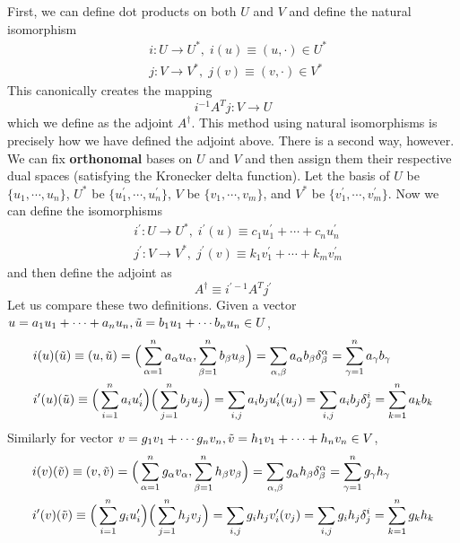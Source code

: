   First, we can define dot products on both $U$ and $V$ and define the natural isomorphism 
  \begin{align*}
    &i: U \longrightarrow U^\ast, \; i(u) \equiv (u, \cdot) \in U^\ast\\
    &j: V \longrightarrow V^\ast, \; j(v) \equiv (v, \cdot) \in V^\ast
  \end{align*}
  This canonically creates the mapping 
  \begin{equation}
    i^{-1} A^T j: V \longrightarrow U
  \end{equation}
  which we define as the adjoint $A^\dagger$. This method using natural isomorphisms is precisely how we have defined the adjoint above. There is a second way, however. We can fix \textbf{orthonomal} bases on $U$ and $V$ and then assign them their respective dual spaces (satisfying the Kronecker delta function). Let the basis of $U$ be $\{u_1, \cdots, u_n\}$, $U^\ast$ be $\{u_1^\prime, \cdots, u_n^\prime\}$, $V$ be $\{v_1, \cdots, v_m\}$, and $V^\ast$ be $\{v_1^\prime, \cdots, v_m^\prime\}$. Now we can define the isomorphisms 
  \begin{align*}
    & i^\prime: U \longrightarrow U^\ast, \; i^\prime (u) \equiv c_1 u_1^\prime + \cdots + c_n u_n^\prime \\
    & j^\prime: V \longrightarrow V^\ast, \; j^\prime (v) \equiv k_1 v_1^\prime + \cdots + k_m v_m^\prime
  \end{align*}
  and then define the adjoint as 
  \begin{equation}
    A^\dagger \equiv i^{\prime -1} A^T j^\prime
  \end{equation}
  Let us compare these two definitions. Given a vector $u = a_1 u_1 + \cdots + a_n u_n, \Tilde{u} = b_1 u_1 + \cdots b_n u_n \in U$, 
  \begin{align*}
    &i(u)(\Tilde{u}) \equiv (u, \Tilde{u}) = \Big(\sum_{\alpha = 1}^n a_\alpha u_\alpha, \sum_{\beta = 1}^n b_\beta u_\beta \Big) = \sum_{\alpha, \beta} a_\alpha b_\beta \delta^\alpha_\beta = \sum_{\gamma=1}^n a_\gamma b_\gamma \\
    &i^\prime(u)(\Tilde{u}) \equiv \Big(\sum_{i=1}^n a_i u_i^\prime \Big) \Big( \sum_{j=1}^n b_j u_j \Big) = \sum_{i, j} a_i b_j u_i^\prime (u_j) = \sum_{i, j} a_i b_j \delta^i_j = \sum_{k=1}^n a_k b_k
  \end{align*}
  Similarly for vector $v = g_1 v_1 + \cdots g_n v_n, \Tilde{v} = h_1 v_1 + \cdots + h_n v_n \in V$, 
  \begin{align*}
    &i(v)(\Tilde{v}) \equiv (v, \Tilde{v}) = \Big(\sum_{\alpha = 1}^n g_\alpha v_\alpha, \sum_{\beta = 1}^n h_\beta v_\beta \Big) = \sum_{\alpha, \beta} g_\alpha h_\beta \delta^\alpha_\beta = \sum_{\gamma=1}^n g_\gamma h_\gamma \\
    &i^\prime(v)(\Tilde{v}) \equiv \Big(\sum_{i=1}^n g_i u_i^\prime \Big) \Big( \sum_{j=1}^n h_j v_j \Big) = \sum_{i, j} g_i h_j v_i^\prime (v_j) = \sum_{i, j} g_i h_j \delta^i_j = \sum_{k=1}^n g_k h_k
  \end{align*}
